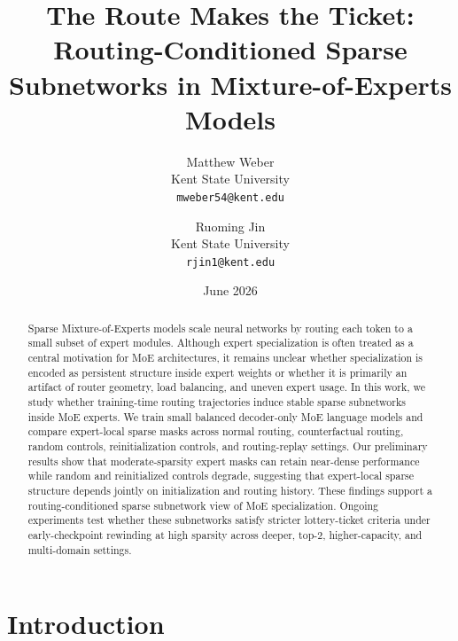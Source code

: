 \documentclass[11pt]{article}
\title{The Route Makes the Ticket: Routing-Conditioned Sparse Subnetworks in Mixture-of-Experts Models}
\author{
Matthew Weber \\ Kent State University \\ \texttt{mweber54@kent.edu}
\and
Ruoming Jin \\ Kent State University \\ \texttt{rjin1@kent.edu}
}
\date{June 2026}
\begin{document}
\maketitle

\begin{abstract}
Sparse Mixture-of-Experts models scale neural networks by routing each token to a small subset of expert modules. Although expert specialization is often treated as a central motivation for MoE architectures, it remains unclear whether specialization is encoded as persistent structure inside expert weights or whether it is primarily an artifact of router geometry, load balancing, and uneven expert usage. In this work, we study whether training-time routing trajectories induce stable sparse subnetworks inside MoE experts. We train small balanced decoder-only MoE language models and compare expert-local sparse masks across normal routing, counterfactual routing, random controls, reinitialization controls, and routing-replay settings. Our preliminary results show that moderate-sparsity expert masks can retain near-dense performance while random and reinitialized controls degrade, suggesting that expert-local sparse structure depends jointly on initialization and routing history. These findings support a routing-conditioned sparse subnetwork view of MoE specialization. Ongoing experiments test whether these subnetworks satisfy stricter lottery-ticket criteria under early-checkpoint rewinding at high sparsity across deeper, top-2, higher-capacity, and multi-domain settings.
\end{abstract}

\section{Introduction}
\end{document}
